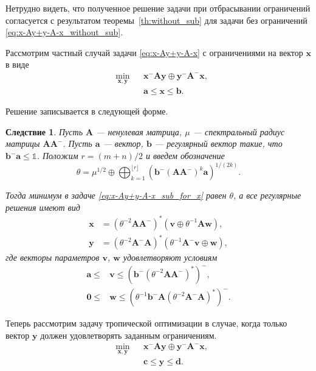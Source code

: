 \documentclass[specialist,
               substylefile = spbu.rtx,
               subf,href,colorlinks=true, 12pt]{disser}
\newtheorem{corollary}{Следствие}
\theoremstyle{definition}
\begin{document}
Нетрудно видеть, что полученное решение задачи при отбрасывании ограничений согласуется с результатом теоремы~\ref{th:without_sub} для задачи без ограничений \eqref{eq:x-Ay+y-A-x_without_sub}.

Рассмотрим частный случай задачи \eqref{eq:x-Ay+y-A-x} с ограничениями на вектор $\bm{x}$ в виде
\begin{equation}\label{eq:x-Ay+y-A-x_sub_for_x}
\begin{aligned}
&
\min_{\bm{x},\bm{y}}
&&\bm{x}^{-}\bm{A}\bm{y}
\oplus
\bm{y}^{-}\bm{A}^{-}\bm{x},\\
& &&\bm{a}\leq\bm{x}\leq\bm{b}.
\end{aligned}
\end{equation}

Решение записывается в следующей форме.
\begin{corollary}\label{th:cor:trop_nonzero_sub_for_x}
Пусть $\bm{A}$ --- ненулевая матрица, $\mu$ --- спектральный радиус матрицы $\bm{A}\bm{A}^{-}$. Пусть $\bm{a}$ --- вектор, $\bm{b}$ --- регулярный вектор такие, что $\bm{b}^{-}\bm{a}\leq\mathbb{1}$.  Положим $r=(m+n)/2$ и введем обозначение
\begin{equation}\label{eq:theta_x}
\theta
=
\mu^{1/2}
\oplus
\bigoplus_{k=1}^{\lfloor r\rfloor}
\left(
\bm{b}^{-}(\bm{A}\bm{A}^{-})^{k}\bm{a}
\right)^{1/(2k)}
.
\end{equation}

Тогда минимум в задаче \eqref{eq:x-Ay+y-A-x_sub_for_x} равен $\theta$, а все регулярные решения имеют вид
\begin{align*}
\bm{x}
&=
(\theta^{-2}\bm{A}\bm{A}^{-})^{\ast}(\bm{v}\oplus\theta^{-1}\bm{A}\bm{w})
,
\\
\bm{y}
&=
(\theta^{-2}\bm{A}^{-}\bm{A})^{\ast}(\theta^{-1}\bm{A}^{-}\bm{v}\oplus\bm{w})
,
\end{align*}
где векторы параметров $\bm{v}$, $\bm{w}$ удовлетворяют условиям
\begin{align*}
\bm{a}
\leq
&\bm{v}
\leq
(\bm{b}^{-}(\theta^{-2}\bm{A}\bm{A}^{-})^{\ast})^{-}
,
\\
\bm{0}
\leq
&\bm{w}
\leq
(\theta^{-1}\bm{b}^{-}\bm{A}(\theta^{-2}\bm{A}^{-}\bm{A})^{\ast})^{-}
.
\end{align*}
\end{corollary}

Теперь рассмотрим задачу тропической оптимизации в случае, когда только вектор $\bm{y}$ должен удовлетворять заданным ограничениям.
\begin{equation}\label{eq:x-Ay+y-A-x_sub_for_y}
\begin{aligned}
&
\min_{\bm{x},\bm{y}}
&&\bm{x}^{-}\bm{A}\bm{y}
\oplus
\bm{y}^{-}\bm{A}^{-}\bm{x},\\
& &&\bm{c}\leq\bm{y}\leq\bm{d}.
\end{aligned}
\end{equation}
\end{document}
